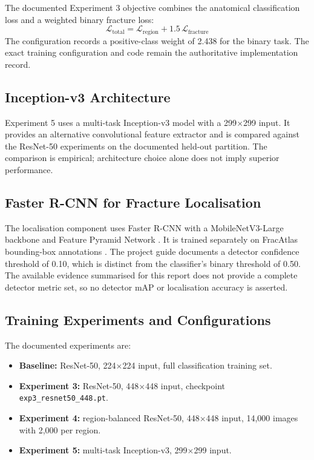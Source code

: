 \documentclass{article}
\begin{document}
The documented Experiment 3 objective combines the anatomical classification loss and a weighted binary fracture loss:
\begin{equation}
\mathcal{L}_{\text{total}} = \mathcal{L}_{\text{region}} + 1.5 \, \mathcal{L}_{\text{fracture}}
\end{equation}
The configuration records a positive-class weight of 2.438 for the binary task. The exact training configuration and code remain the authoritative implementation record.

\subsection{Inception-v3 Architecture}
Experiment 5 uses a multi-task Inception-v3 model \cite{szegedy2016rethinking} with a 299$\times$299 input. It provides an alternative convolutional feature extractor and is compared against the ResNet-50 experiments on the documented held-out partition. The comparison is empirical; architecture choice alone does not imply superior performance.

\subsection{Faster R-CNN for Fracture Localisation}
The localisation component uses Faster R-CNN \cite{ren2015faster} with a MobileNetV3-Large backbone \cite{howard2019searching} and Feature Pyramid Network \cite{lin2017feature}. It is trained separately on FracAtlas bounding-box annotations \cite{rahman2023fracatlas}. The project guide documents a detector confidence threshold of 0.10, which is distinct from the classifier's binary threshold of 0.50. The available evidence summarised for this report does not provide a complete detector metric set, so no detector mAP or localisation accuracy is asserted.

\subsection{Training Experiments and Configurations}
The documented experiments are:
\begin{itemize}[noitemsep]
    \item \textbf{Baseline:} ResNet-50, 224$\times$224 input, full classification training set.
    \item \textbf{Experiment 3:} ResNet-50, 448$\times$448 input, checkpoint \texttt{exp3\_resnet50\_448.pt}.
    \item \textbf{Experiment 4:} region-balanced ResNet-50, 448$\times$448 input, 14,000 images with 2,000 per region.
    \item \textbf{Experiment 5:} multi-task Inception-v3, 299$\times$299 input.
\end{itemize}
\end{document}
